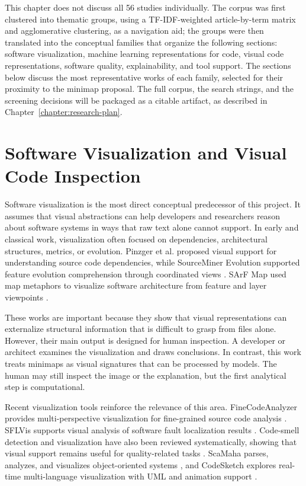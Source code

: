 This chapter does not discuss all 56 studies individually. The corpus was
first clustered into thematic groups, using a TF-IDF-weighted
article-by-term matrix and agglomerative clustering, as a navigation aid; the
groups were then translated into the conceptual families that organize the
following sections: software visualization, machine learning representations
for code, visual code representations, software quality, explainability, and
tool support. The sections below discuss the most representative works of each
family, selected for their proximity to the minimap proposal. The full corpus,
the search strings, and the screening decisions will be packaged as a citable
artifact, as described in Chapter~\ref{chapter:research-plan}.

\section{Software Visualization and Visual Code Inspection}

Software visualization is the most direct conceptual predecessor of this
project. It assumes that visual abstractions can help developers and researchers
reason about software systems in ways that raw text alone cannot support. In
early and classical work, visualization often focused on dependencies,
architectural structures, metrics, or evolution. Pinzger et al.
\cite{pinzger2008tool} proposed visual support for understanding source code
dependencies, while SourceMiner Evolution supported feature evolution
comprehension through coordinated views \cite{novais2013sourceminer}. SArF Map
used map metaphors to visualize software architecture from feature and layer
viewpoints \cite{kobayashi2013sarf}.

These works are important because they show that visual representations can
externalize structural information that is difficult to grasp from files alone.
However, their main output is designed for human inspection. A developer or
architect examines the visualization and draws conclusions. In contrast, this
work treats minimaps as visual signatures that can be processed by
models. The human may still inspect the image or the explanation, but the first
analytical step is computational.

Recent visualization tools reinforce the relevance of this area. FineCodeAnalyzer
provides multi-perspective visualization for fine-grained source code analysis
\cite{qayum2022finecodeanalyzer}. SFLVis supports visual analysis of software
fault localization results \cite{sun2024sflvis}. Code-smell detection and
visualization have also been reviewed systematically, showing that visual support
remains useful for quality-related tasks \cite{reis2022code}. ScaMaha parses,
analyzes, and visualizes object-oriented systems \cite{almsiedeen2025scamaha},
and CodeSketch explores real-time multi-language visualization with UML and
animation support \cite{shrivastava2025codesketch}.

